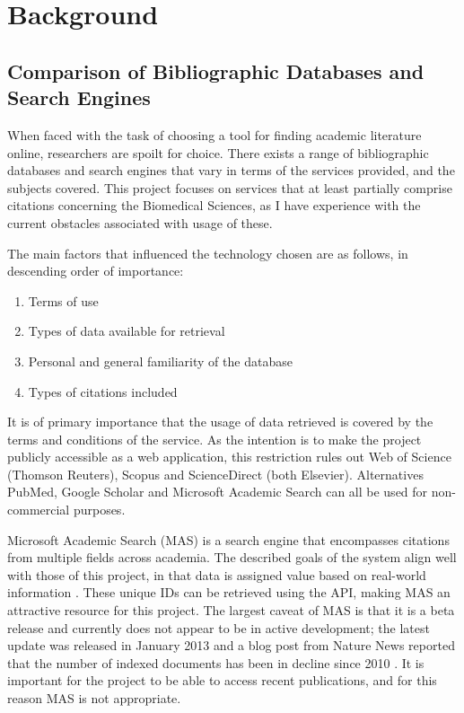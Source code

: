 \documentclass[PROP_AGutteridge_CS.tex]{subfiles}
\begin{document}
\chapter{Background}
\section{Comparison of Bibliographic Databases and Search Engines}
When faced with the task of choosing a tool for finding academic literature online, researchers are spoilt for choice. There exists a range of bibliographic databases and search engines that vary in terms of the services provided, and the subjects covered. This project focuses on services that at least partially comprise citations concerning the Biomedical Sciences, as I have experience with the current obstacles associated with usage of these.\\ \par

The main factors that influenced the technology chosen are as follows, in descending order of importance:
\begin{enumerate}
\item Terms of use
\item Types of data available for retrieval
\item Personal and general familiarity of the database
\item Types of citations included
\end{enumerate}

It is of primary importance that the usage of data retrieved is covered by the terms and conditions of the service. As the intention is to make the project publicly accessible as a web application, this restriction rules out Web of Science (Thomson Reuters), Scopus and ScienceDirect (both Elsevier). Alternatives PubMed, Google Scholar and Microsoft Academic Search can all be used for non-commercial purposes.

Microsoft Academic Search (MAS) is a search engine that encompasses citations from multiple fields across academia. The described goals of the system align well with those of this project, in that data is assigned value based on real-world information \cite{microsoft-help}. These unique IDs can be retrieved using the API, making MAS an attractive resource for this project. The largest caveat of MAS is that it is a beta release and currently does not appear to be in active development; the latest update was released in January 2013 \cite{microsoft-help} and a blog post from Nature News reported that the number of indexed documents has been in decline since 2010 \cite{nature-news}. It is important for the project to be able to access recent publications, and for this reason MAS is not appropriate.
\end{document}

